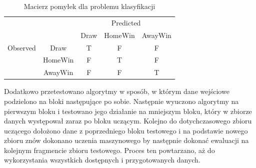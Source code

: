 \begin{center}
\begin{table}[H]
\renewcommand{\arraystretch}{1.5}
\caption{Macierz pomyłek dla problemu klasyfikacji}
\label{tab:macierz}
\begin{center}
\begin{tabular}{|c|c|c|c|c|}
   \cline{3-5} 
   \multicolumn{1}{c}{} & & \multicolumn{3}{c|}{Predicted} \\ \cline{3-5}
   \multicolumn{1}{c}{} & & Draw & HomeWin & AwayWin \\ \hline
   
   {Observed}
   & Draw & T & F & F \\ \cline{2-5}
   & HomeWin & F & T & F  \\ \cline{2-5}
   & AwayWin & F & F & T \\ \hline
\end{tabular}
\end{center}
\end{table}
\end{center}

Dodatkowo przetestowano algorytmy w sposób, w którym dane wejściowe podzielono na bloki następujące po sobie. Następnie wyuczono algorytmy na pierwszym bloku i testowano jego działanie na mniejszym bloku, który w zbiorze danych występował zaraz po bloku uczącym. Kolejno do dotychczasowego zbioru uczącego dołożono dane z poprzedniego bloku testowego i na podstawie nowego zbioru znów dokonano uczenia maszynowego by następnie dokonać ewaluacji na kolejnym fragmencie zbioru testowego. Proces ten powtarzano, aż do wykorzystania wszystkich dostępnych i przygotowanych danych.


